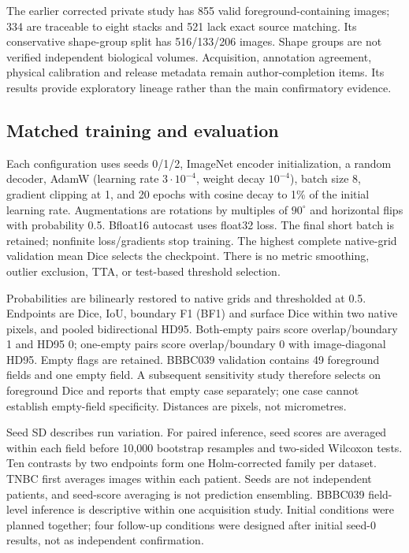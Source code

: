 \documentclass{article}
\begin{document}
The earlier corrected private study has 855 valid foreground-containing images; 334 are traceable to eight stacks and 521 lack exact source matching. Its conservative shape-group split has 516/133/206 images. Shape groups are not verified independent biological volumes. Acquisition, annotation agreement, physical calibration and release metadata remain author-completion items. Its results provide exploratory lineage rather than the main confirmatory evidence.

\subsection{Matched training and evaluation}
Each configuration uses seeds 0/1/2, ImageNet encoder initialization, a random decoder, AdamW (learning rate $3\cdot10^{-4}$, weight decay $10^{-4}$), batch size 8, gradient clipping at 1, and 20 epochs with cosine decay to 1\% of the initial learning rate. Augmentations are rotations by multiples of $90^\circ$ and horizontal flips with probability 0.5. Bfloat16 autocast uses float32 loss. The final short batch is retained; nonfinite loss/gradients stop training. The highest complete native-grid validation mean Dice selects the checkpoint. There is no metric smoothing, outlier exclusion, TTA, or test-based threshold selection.

Probabilities are bilinearly restored to native grids and thresholded at 0.5. Endpoints are Dice, IoU, boundary F1 (BF1) and surface Dice within two native pixels, and pooled bidirectional HD95. Both-empty pairs score overlap/boundary 1 and HD95 0; one-empty pairs score overlap/boundary 0 with image-diagonal HD95. Empty flags are retained. BBBC039 validation contains 49 foreground fields and one empty field. A subsequent sensitivity study therefore selects on foreground Dice and reports that empty case separately; one case cannot establish empty-field specificity. Distances are pixels, not micrometres.

Seed SD describes run variation. For paired inference, seed scores are averaged within each field before 10,000 bootstrap resamples and two-sided Wilcoxon tests. Ten contrasts by two endpoints form one Holm-corrected family per dataset. TNBC first averages images within each patient. Seeds are not independent patients, and seed-score averaging is not prediction ensembling. BBBC039 field-level inference is descriptive within one acquisition study. Initial conditions were planned together; four follow-up conditions were designed after initial seed-0 results, not as independent confirmation.
\end{document}
